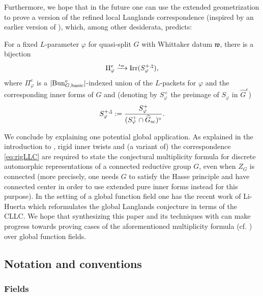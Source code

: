 Furthermore, we hope that in the future one can use the extended geometrization to prove a version of the refined local Langlands correspondence (inspired by an earlier version of \cite{Fargues22}), which, among other desiderata, predicts:

\begin{conj} For a fixed $L$-parameter $\varphi$ for quasi-split $G$ with Whittaker datum $\mathfrak{w}$, there is a bijection
\begin{equation}\label{eq:rigLLC}
 \Pi_{\varphi}^{e}  \xrightarrow{\iota_{\mathfrak{w}}}  \textnormal{Irr}(S_{\varphi}^{+,\natural}),
\end{equation}
where $\Pi_{\varphi}^{e}$ is a $|\mathrm{Bun}_{G,\textnormal{basic}}^{e}|$-indexed union of the $L$-packets for $\varphi$ and the corresponding inner forms of $G$ and (denoting by $S_{\varphi}^{+}$ the preimage of $S_{\varphi}$ in $\widehat{G}^{e}$)
\begin{equation*}
S_{\varphi}^{+,\natural} := \frac{S_{\varphi}^{+}}{(S_{\varphi}^{+} \cap \widehat{G}_{\textnormal{sc}})^{\circ}}.
\end{equation*}
\end{conj}

We conclude by explaining one potential global application. As explained in the introduction to \cite{Kaletha18b}, rigid inner twists and (a variant of) the correspondence \eqref{eq:rigLLC} are required to state the conjectural multiplicity formula for discrete automorphic representations of a connected reductive group $G$, even when $Z_{G}$ is connected (more precisely, one needs $G$ to satisfy the Hasse principle and have connected center in order to use extended pure inner forms instead for this purpose). In the setting of a global function field one has the recent work \cite{DLH26} of Li-Huerta which reformulates the global Langlands conjecture in terms of the CLLC. We hope that synthesizing this paper and its techniques with \cite{DLH26} can make progress towards proving cases of the aforementioned multiplicity formula (cf. \cite[Conjecture 5.6]{Dillery26}) over global function fields.


\subsection{Notation and conventions}

\subsubsection{Fields}

